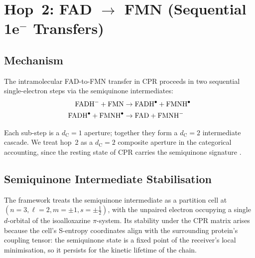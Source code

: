 \documentclass[11pt,twocolumn,a4paper]{article}
\theoremstyle{definition}
\theoremstyle{remark}
\newcommand{\dC}{d_{\mathrm{C}}}
\begin{document}
\section{Hop~2: FAD $\to$ FMN (Sequential 1e$^-$ Transfers)}
\label{sec:hop2}

\subsection{Mechanism}

The intramolecular FAD-to-FMN transfer in CPR proceeds in two sequential
single-electron steps via the semiquinone intermediates:
\begin{align}
\ce{FADH^-} + \ce{FMN} &\to \ce{FADH^.} + \ce{FMNH^.} \label{eq:hop2a} \\
\ce{FADH^.} + \ce{FMNH^.} &\to \ce{FAD} + \ce{FMNH^-} \label{eq:hop2b}
\end{align}

Each sub-step is a $\dC = 1$ aperture; together they form a $\dC = 2$
intermediate cascade. We treat hop~2 as a $\dC = 2$ composite aperture
in the categorical accounting, since the resting state of CPR carries the
semiquinone signature \citep{narayanasami1997}.

\subsection{Semiquinone Intermediate Stabilisation}

The framework treats the semiquinone intermediate as a partition cell at
$(n=3, \ell=2, m=\pm 1, s=\pm\tfrac{1}{2})$, with the unpaired electron
occupying a single $d$-orbital of the isoalloxazine $\pi$-system. Its
stability under the CPR matrix arises because the cell's S-entropy
coordinates align with the surrounding protein's coupling tensor: the
semiquinone state is a fixed point of the receiver's local minimisation,
so it persists for the kinetic lifetime of the chain.
\end{document}
